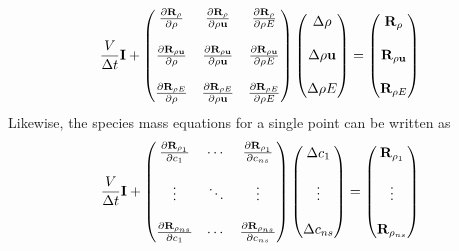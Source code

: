 \begin{equation}
  \frac{V}{\Delta t}\mathbf I + 
  \begin{pmatrix}
    \frac{\partial \mathbf R_{\rho}}{\partial \rho} & \frac{\partial \mathbf R_{\rho}}{\partial \rho \mathbf u} & \frac{\partial \mathbf R_{\rho}}{\partial \rho E} \\ \\
    \frac{\partial \mathbf R_{\rho \mathbf u}}{\partial \rho} & \frac{\partial \mathbf R_{\rho \mathbf u}}{\partial \rho \mathbf u} & \frac{\partial \mathbf R_{\rho \mathbf u}}{\partial \rho E} \\ \\
    \frac{\partial \mathbf R_{\rho E}}{\partial \rho} & \frac{\partial \mathbf R_{\rho E}}{\partial \rho \mathbf u} & \frac{\partial \mathbf R_{\rho E}}{\partial \rho E}
  \end{pmatrix}
  \begin{pmatrix}
    \Delta \rho \\ \\
    \Delta \rho \mathbf u \\ \\
    \Delta \rho E
  \end{pmatrix}
  =
  \begin{pmatrix}
    \mathbf R_{\rho} \\ \\
    \mathbf R_{\rho \mathbf u} \\ \\
    \mathbf R_{\rho E}
  \end{pmatrix}
  \label{approx-jac}
\end{equation}
Likewise, the species mass equations for a single point can be written as
\begin{equation}
  \frac{V}{\Delta t}\mathbf I + 
  \begin{pmatrix}
    \frac{\partial \mathbf R_{\rho_1}}{\partial c_1} & \cdots & \frac{\partial \mathbf R_{\rho_{1}}}{\partial c_{ns}} \\ \\
    \vdots & \ddots & \vdots \\ \\
    \frac{\partial \mathbf R_{\rho_{ns}}}{\partial c_1} & \cdots & \frac{\partial \mathbf R_{\rho_{ns}}}{\partial c_{ns}}
  \end{pmatrix}
  \begin{pmatrix}
    \Delta c_1 \\ \\
    \vdots \\ \\
    \Delta c_{ns}
  \end{pmatrix}
  =
  \begin{pmatrix}
    \mathbf R_{\rho_1} \\ \\
    \vdots \\ \\
    \mathbf R_{\rho_{ns}}
  \end{pmatrix}
  \label{approx-jac-dc}
\end{equation}
